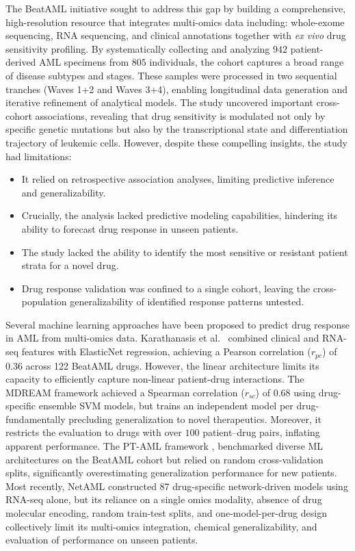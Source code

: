 \documentclass[pdflatex,sn-mathphys-num]{sn-jnl}
\theoremstyle{thmstyleone}
\theoremstyle{thmstyletwo}
\theoremstyle{thmstylethree}
\begin{document}
The BeatAML initiative \cite{bottomly2022integrative} sought to address this gap by building a comprehensive, high-resolution resource that integrates multi-omics data including: whole-exome sequencing, RNA sequencing, and clinical annotations together with \textit{ex vivo} drug sensitivity profiling. By systematically collecting and analyzing $942$ patient-derived AML specimens from $805$ individuals, the cohort captures a broad range of disease subtypes and stages. These samples were processed in two sequential tranches (Waves 1+2 and Waves 3+4), enabling longitudinal data generation and iterative refinement of analytical models. The study uncovered important cross-cohort associations, revealing that drug sensitivity is modulated not only by specific genetic mutations but also by the transcriptional state and differentiation trajectory of leukemic cells. However, despite these compelling insights, the study \cite{bottomly2022integrative} had limitations:
\begin{itemize}
    \item It relied on retrospective association analyses, limiting predictive inference and generalizability.
    \item Crucially, the analysis lacked predictive modeling capabilities, hindering its ability to forecast drug response in unseen patients.
    \item The study lacked the ability to identify the most sensitive or resistant patient strata for a novel drug.
    \item Drug response validation was confined to a single cohort, leaving the cross-population generalizability of identified response patterns untested.
\end{itemize}
Several machine learning approaches have been proposed to predict drug response in AML from multi-omics data. Karathanasis et al.\ \cite{karathanasis2024machine} combined clinical and RNA-seq features with ElasticNet regression, achieving a Pearson correlation ($r_{pc}$) of $0.36$ across 122 BeatAML drugs. However, the linear architecture limits its capacity to efficiently capture non-linear patient-drug interactions. The MDREAM framework \cite{trac2023prediction} achieved a Spearman correlation ($r_{sc}$) of $0.68$ using drug-specific ensemble SVM models, but trains an independent model per drug-fundamentally precluding generalization to novel therapeutics. Moreover, it restricts the evaluation to drugs with over $100$ patient–drug pairs, inflating apparent performance. The PT-AML framework \cite{jani2024pt}, benchmarked diverse ML architectures on the BeatAML cohort but relied on random cross-validation splits, significantly overestimating generalization performance for new patients. Most recently, NetAML \cite{wang2025netaml} constructed 87 drug-specific network-driven models using RNA-seq alone, but its reliance on a single omics modality, absence of drug molecular encoding, random train-test splits, and one-model-per-drug design collectively limit its multi-omics integration, chemical generalizability, and evaluation of performance on unseen patients.
\end{document}
